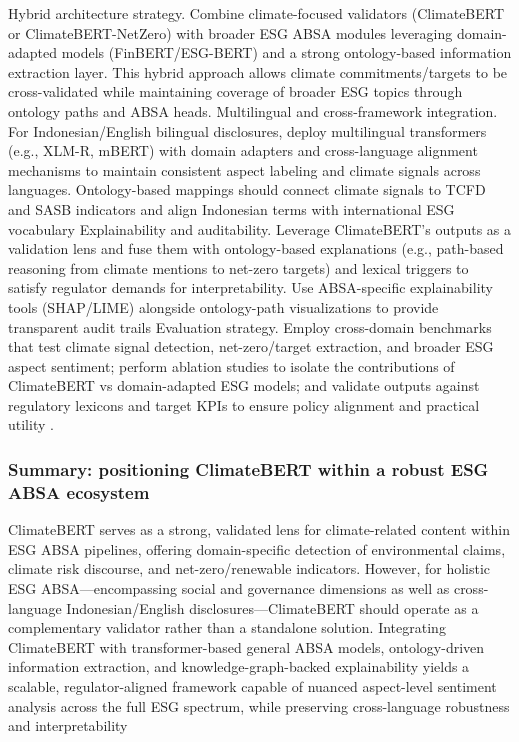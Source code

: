 Hybrid architecture strategy. Combine climate-focused validators (ClimateBERT or ClimateBERT-NetZero) with broader ESG ABSA modules leveraging domain-adapted models (FinBERT/ESG-BERT) and a strong ontology-based information extraction layer. This hybrid approach allows climate commitments/targets to be cross-validated while maintaining coverage of broader ESG topics through ontology paths and ABSA heads.
Multilingual and cross-framework integration. For Indonesian/English bilingual disclosures, deploy multilingual transformers (e.g., XLM-R, mBERT) with domain adapters and cross-language alignment mechanisms to maintain consistent aspect labeling and climate signals across languages. Ontology-based mappings should connect climate signals to TCFD and SASB indicators and align Indonesian terms with international ESG vocabulary \cite{10.1016/j.inffus.2025.103073,10.1111/eufm.12509,10.48550/arxiv.2511.00024,10.1002/csr.70116}
Explainability and auditability. Leverage ClimateBERT’s outputs as a validation lens and fuse them with ontology-based explanations (e.g., path-based reasoning from climate mentions to net-zero targets) and lexical triggers to satisfy regulator demands for interpretability. Use ABSA-specific explainability tools (SHAP/LIME) alongside ontology-path visualizations to provide transparent audit trails \cite{10.1111/1475-679x.12575,10.3390/su11041093}
Evaluation strategy. Employ cross-domain benchmarks that test climate signal detection, net-zero/target extraction, and broader ESG aspect sentiment; perform ablation studies to isolate the contributions of ClimateBERT vs domain-adapted ESG models; and validate outputs against regulatory lexicons and target KPIs to ensure policy alignment and practical utility \cite{10.18653/v1/2023.emnlp-main.975,10.1371/journal.pone.0288052,10.48550/arxiv.2511.00024}.
\subsubsection{Summary: positioning ClimateBERT within a robust ESG ABSA ecosystem}

ClimateBERT serves as a strong, validated lens for climate-related content within ESG ABSA pipelines, offering domain-specific detection of environmental claims, climate risk discourse, and net-zero/renewable indicators. However, for holistic ESG ABSA—encompassing social and governance dimensions as well as cross-language Indonesian/English disclosures—ClimateBERT should operate as a complementary validator rather than a standalone solution. Integrating ClimateBERT with transformer-based general ABSA models, ontology-driven information extraction, and knowledge-graph-backed explainability yields a scalable, regulator-aligned framework capable of nuanced aspect-level sentiment analysis across the full ESG spectrum, while preserving cross-language robustness and interpretability \cite{10.18653/v1/2023.emnlp-main.975,10.1371/journal.pone.0288052,10.48550/arxiv.2511.00024,10.1145/3503044,10.1111/1475-679x.12575}